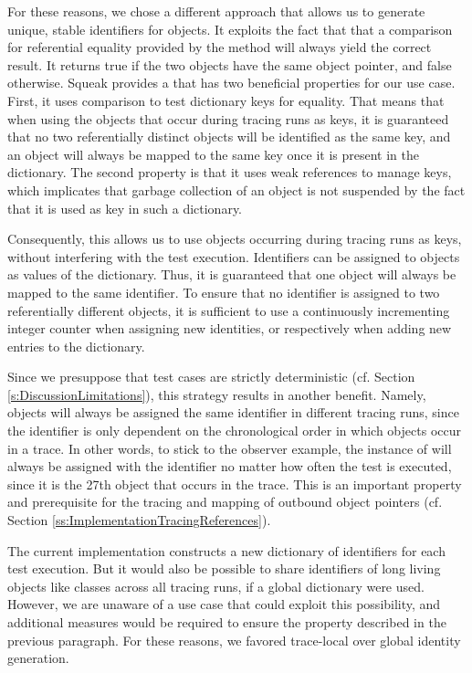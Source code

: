 For these reasons, we chose a different approach that allows us to generate unique, stable identifiers for objects.
It exploits the fact that that a comparison for referential equality provided by the \inlinecode{==} method will always yield the correct result.
It returns true if the two objects have the same object pointer, and false otherwise.
Squeak provides a  that has two beneficial properties for our use case.
First, it uses \inlinecode{==} comparison to test dictionary keys for equality.
That means that when using the objects that occur during tracing runs as keys, it is guaranteed that no two referentially distinct objects will be identified as the same key, and an object will always be mapped to the same key once it is present in the dictionary.
The second property is that it uses weak references to manage keys, which implicates that garbage collection of an object is not suspended by the fact that it is used as key in such a dictionary.

Consequently, this allows us to use objects occurring during tracing runs as keys, without interfering with the test execution.
Identifiers can be assigned to objects as values of the dictionary.
Thus, it is guaranteed that one object will always be mapped to the same identifier.
To ensure that no identifier is assigned to two referentially different objects, it is sufficient to use a continuously incrementing integer counter when assigning new identities, or respectively when adding new entries to the dictionary.

Since we presuppose that test cases are strictly deterministic (cf. Section \ref{s:DiscussionLimitations}), this strategy results in another benefit.
Namely, objects will always be assigned the same identifier in different tracing runs, since the identifier is only dependent on the chronological order in which objects occur in a trace.
In other words, to stick to the observer example, the instance of  will always be assigned with the identifier  no matter how often the test is executed, since it is the 27th object that occurs in the trace.
This is an important property and prerequisite for the tracing and mapping of outbound object pointers (cf. Section \ref{ss:ImplementationTracingReferences}).

The current implementation constructs a new dictionary of identifiers for each test execution.
But it would also be possible to share identifiers of long living objects like classes across all tracing runs, if a global dictionary were used.
However, we are unaware of a use case that could exploit this possibility, and additional measures would be required to ensure the property described in the previous paragraph.
For these reasons, we favored trace-local over global identity generation.

